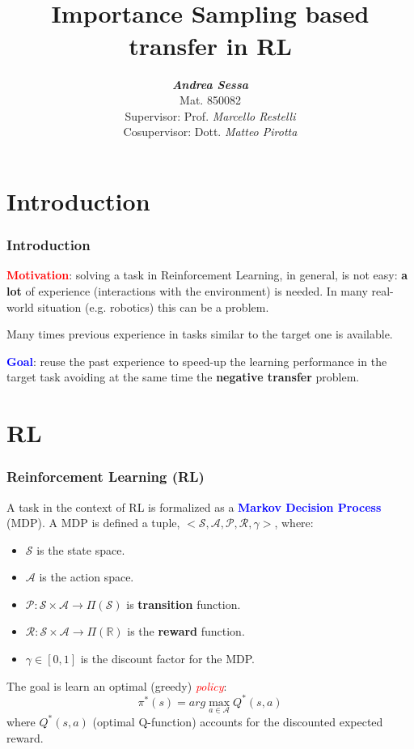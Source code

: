\documentclass[professionalfont]{beamer}
\title[Importance Sampling based transfer in RL]{\textbf{\\Importance Sampling based \\ transfer in RL}}
\author[A. Sessa]{\textbf{\emph{Andrea Sessa}}\\
{\small{Mat. 850082}}
\vspace{2mm}
{\small \href{}{\nolinkurl{}}}\\
 \small{Supervisor: Prof. \emph{Marcello Restelli}} \\
 \small{Cosupervisor: Dott. \emph{Matteo Pirotta}}}
\date{}
\begin{document}
  \begin{frame}[plain]
    \titlepage
  \end{frame}

  \section{Introduction}
    \begin{frame}
    \frametitle{Introduction}
      \textcolor{red}{\textbf{Motivation}}: solving a task in Reinforcement Learning, in general, is not easy: \textbf{a lot} of experience (interactions with the environment)
      is needed. In many real-world situation (e.g. robotics) this can be a problem.\newline

      Many times previous experience in tasks similar to the target one is available.\newline

      \textcolor{blue}{\textbf{Goal}}: reuse the past experience to speed-up the learning performance in the target task
      avoiding at the same time the \textbf{negative transfer} problem.
    \end{frame}

  \section{RL}
    \begin{frame}
	  \frametitle{Reinforcement Learning (RL)}
      A task in the context of RL is formalized as a \textcolor{blue}{\textbf{Markov Decision Process}} (MDP). \newline
      A MDP is defined a tuple, $<\mathcal{S}, \mathcal{A}, \mathcal{P}, \mathcal{R}, \gamma>$, where:
      \begin{itemize}
        \item $\mathcal{S}$ is the state space.
        \item $\mathcal{A}$ is the action space.
        \item $\mathcal{P}: \mathcal{S} \times \mathcal{A} \rightarrow \Pi(\mathcal{S})$ is \textbf{transition} function.
        \item $\mathcal{R}: \mathcal{S} \times \mathcal{A} \rightarrow \Pi(\mathbb{R})$ is the \textbf{reward} function.
        \item $\gamma \in [0,1]$ is the discount factor for the MDP.
      \end{itemize}
      The goal is learn an optimal (greedy) \textcolor{red}{\emph{policy}}:
      \begin{equation*}
        \pi^{*}(s) = arg\max_{a \in \mathcal{A}} Q^{*}(s,a)
      \end{equation*}
      where $Q^{*}(s,a)$ (optimal Q-function) accounts for the discounted expected reward.
    \end{frame}
\end{document}
